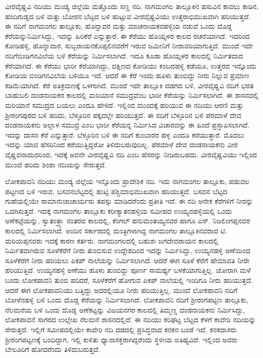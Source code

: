 ವೀರವೈಷ್ಣವಿ ನದಿಯು ಮಂಡ್ಯ ಜಿಲ್ಲೆಯ ಮತ್ತೊಂದು ಸಣ್ಣ ನದಿ. ನಾಗಮಂಗಲ ತಾಲ್ಲೂಕಿನ ಹಸುವಿನ ಕಾವಲು ಕಾಡಿನ, ಹಂದಿಗುಡ್ಡದ ಬಳಿ ಮತ್ತು ಬೋರನ ಬೆಟ್ಟದ ಬಳಿ ಹುಟ್ಟುವ ವೀರವೈಷ್ಣವಿಯು ಉತ್ತರಾಭಿಮುಖವಾಗಿ ಹರಿಯುತ್ತದೆ. ಈ ನದಿಗೆ ನಾಗಮಂಗಲ ತಾಲ್ಲೂಕು, ಹೊನ್ನಾವರ ಮತ್ತು ಮಾಚನಾಯಕನಹಳ್ಳಿಯ ನಡುವೆ ಒಂದು ದೊಡ್ಡ ಕೆರೆಯನ್ನು\break ನಿರ್ಮಿಸಿದ್ದು, ಇದನ್ನು ಹಿರಿಕೆರೆ ಎನ್ನುತ್ತಾರೆ. ಈ ಕೆರೆಯು ಹೊಯ್ಸಳರ ಕಾಲದ ರಚನೆಯಾಗಿದೆ. ಇದರಿಂದ ಕೋಡಿಹಳ್ಳಿ, ಹೊನ್ನಾವಾರ, ಸುಬ್ಬರಾಯನಕೊಪ್ಪಲಿನವರೆಗೆ ಇರುವ ಜಮೀನಿಗೆ ನೀರಾವರಿಯಾಗುತ್ತಿದೆ. ಮುಂದೆ ಇದೇ ನದಿಗೆ\break ಬಿಂಡಿಗನವಿಲೆಯ ಬಳಿ ಕೆರೆಯನ್ನು ನಿರ್ಮಿಸಲಾಗಿದೆ. ಇದೂ ಕೂಡಾ ಹೊಯ್ಸಳರ ಕಾಲದಲ್ಲಿ ನಿರ್ಮಿತವಾದ ಕೆರೆ\-ಯಾಗಿದೆ. ಈ ಕೆರೆಯು ಭಾರೀ ಕೆರೆಯಾಗಿದ್ದು, ದಕ್ಷಿಣದ ಕೋಡಿಯು ಕಂಬದಹಳ್ಳಿ ಕಡೆಯೂ, ಉತ್ತರದ ಇನ್ನೊಂದು ಕೋಡಿಯ ಬಿಂಡಿಗನವಿಲೆಯ ಬಳಿಯೂ ಇದೆ. ಆದರೆ ಈ ಕೆರೆ ಇಂದು ಹೂಳು ತುಂಬಿದ್ದು ನೀರು ನಿಲ್ಲುವ ಪ್ರಮಾಣ ಕಡಿಮೆಯಾಗಿದೆ. ಕೆರೆ ಅತಿಕ್ರಮಣಕ್ಕೆ ಒಳಗಾಗಿದೆ. ಮುಂದೆ ಇದೇ ತಾಲ್ಲೂಕಿ ದಡಗದ ಬಳಿ, ವೀರವೈಷ್ಣವಿ ನದಿಗೆ ಭರತ ಬಾಹುಬಲಿ ದಂಡನಾಯಕರ ಕಾಲದಲ್ಲಿ ಮರಿಯಾನೆ ಸಮುದ್ರವೆಂಬ ಭಾರೀ ಕೆರೆಯನ್ನು ನಿರ್ಮಿಸಲಾಗಿದೆ. ಈ ಶಾಸನದಲ್ಲಿ ಮರಿಯಾನೆ ಸಮುದ್ರದ ಬಯಲು ಎಂದೂ ಹೇಳಿದೆ. ಇಲ್ಲಿಂದ ಮುಂದಕ್ಕೆ ಹರಿಯುವ ಈ ನದಿಯು ಆರಣಿ ಮತ್ತು ಶ‍್ರೀರಂಗಪುರದ ಬಳಿ ಹರಿದು, ಬೆಳ್ಳೂರಿನ ಪಕ್ಕದಲ್ಲೇ ಹರಿಯುತ್ತದೆ. ಈ ನದಿಗೆ ಬೆಳ್ಳೂರಿನ ಬಳಿ ಪೆರಮಾಳೆ ದೇವ ದಂಡನಾಯಕನು ಅಲ್ಲಾಳ ಸಮುದ್ರ ಎಂಬ ಭಾರೀ ಕೆರೆಯನ್ನ ನಿರ್ಮಿಸಿದ ವಿಚಾರವನ್ನು ಈ ಹಿಂದೆ ಪ್ರಸ್ತಾಪಿಸಲಾಗಿದೆ. ಇದನ್ನು ದಾಸನ ಕೆರೆ ಎನ್ನುತ್ತಾರೆ. ಬೆಳ್ಳೂರಿನ ಬಳಿ ಈ ನದಿಗೆ ಕುಂಬಾರರ ಹಳ್ಳ ಎಂದೂ ಕರೆಯುತ್ತಾರೆ. ಮೊದಲು ಇದನ್ನು ಯಾವ ಹೆಸರಿನಿಂದ ಕರೆಯುತ್ತಿದ್ದರೋ ತಿಳಿದುಬರುವುದಿಲ್ಲ. ಪೆರಮಾಳೆ ದೇವ ದಂಡನಾಯಕನು ವೀರ ವೈಷ್ಣವನಾದುದರಿಂದ, ಇದಕ್ಕೆ ಅವನೇ ವೀರವೈಷ್ಣವಿ ನದಿ ಎಂಬ ಹೆಸರನ್ನು ನೀಡಿರುಬಹದು. ವೀರವೈಷ್ಣವಿಯು ಇಲ್ಲಿಂದ ಮುಂದೆ ಹರಿದು ಶಿಂಶಾ ನದಿಯನ್ನು ಸೇರುತ್ತದೆ.

ಲೋಕಪಾವನಿ ನದಿಯು ಮಂಡ್ಯ ಜಿಲ್ಲೆಯ ಇನ್ನೊಂದು ಪ್ರಾದೇಶಿಕ ನದಿ. ಇದು ನಾಗಮಂಗಲ ತಾಲ್ಲೂಕು, ಪಡುವಲ ಪಟ್ಟಣದ ಬಳಿ ಇರುವ, ಬಸವನಬೆಟ್ಟದಲ್ಲಿ ಹುಟ್ಟಿ ಪಶ್ಚಿಮಾಭಿಮುಖವಾಗಿ ಹರಿಯುತ್ತದೆ. ಬಸವನ ಬೆಟ್ಟದ ಗುಹೆಯಲ್ಲಿಯೇ ರಾಮಾನುಜಾಚಾರ್ಯರು ತಪಸ್ಸು ಮಾಡಿದರೆಂದು ಪ್ರತೀತಿ ಇದೆ. ಈ ನದಿ ಅನೇಕ ಕೆರೆಗಳಿಗೆ ನೀರನ್ನು ಒದಗಿಸುತ್ತದೆ. ಇದಕ್ಕೆ ನಾಗಮಂಗಲ ತಾಲ್ಲೂಕು ಕರೀಕ್ಯಾತನಹಳ್ಳಿಯ ಸಮೀಪದ ಉಯ್ಯನಹಳ್ಳಿಯಲ್ಲಿ ಒಂದು ಅಣೆಕಟ್ಟೆಯನ್ನು, ಸ್ವಾತಂತ್ರ್ಯಾ ನಂತರದ ಕಾಲದಲ್ಲಿ, ಕೆಂಗಲ್​ ಹನುಮಂತಯ್ಯನವರ ಹಾಗೂ ಎಸ್​. ನಿಜಲಿಂಗಪ್ಪನವರ ಕಾಲದಲ್ಲಿ ನಿರ್ಮಿಸಲಾಗಿದೆ. ಅಂದಿನ ಸರ್ಕಾರದಲ್ಲಿ ಮಂತ್ರಿಗಳಾಗಿದ್ದ ನಾಗಮಂಗಲ ತಾಲ್ಲೂಕಿನವರಾದ ಟಿ. ಮರಿಯಪ್ಪನವರು ಇದಕ್ಕೆ ಕಾರಣ ಕರ್ತರು. ನಾಗಮಂಗಲದಲ್ಲಿ ಬಹುಶಃ ಜಗದೇವರಾಯನ ಕಾಲದಲ್ಲಿ ನಿರ್ಮಿತವಾಗಿರುವ ಸೂಳೆಕೆರೆಗೆ ನೀರು ತುಂಬಿಸುವ ಉದ್ದೇಶದಿಂದ ಇದನ್ನು ನಿರ್ಮಿಸಿದ್ದು, ಉಯ್ಯನಹಳ್ಳಿ ಅಣೆಯಿಂದ ಸೂಳೆಕೆರೆಗೆ ನೀರು ಹರಿಯಲು ಪಿಕಪ್ ನಾಲೆಯನ್ನು ನಿರ್ಮಿಸಲಾಗಿದೆ. ಆದರೆ ಈಗ ಸೂಳೆ ಕೆರೆಗೆ ಹೇಮಾವತಿ ನೀರೇ ಹರಿಯುತ್ತಿದೆ. ಉಯ್ಯನಹಳ್ಳಿ ಅಣೆಯು ಹೂಳು ತುಂಬಿದ್ದು ಪೂರ್ಣ ಸಾಮರ್ಥ್ಯ ಬಳಕೆಯಾಗುತ್ತಿಲ್ಲ. ಜೋರಾಗಿ ಮಳೆ ಬಂದು ಲೋಕಪಾವನಿ ತುಂಬಿ ಹರಿದರೆ, ಸೂಳೆಕೆರೆಗೆ ಹೋಗುವ ಪಿಕಪ್​ ನಾಲೆಯಲ್ಲಿ ಇಂದಿಗೂ ನೀರು ಹರಿಯುತ್ತದೆ. ಆದರೆ ಈಗ ಲೋಕಪಾವನಿಯು ಬತ್ತಿದ್ದು ಅದರಲ್ಲಿಯೂ ನೀರು ಹರಿಯುತ್ತಿಲ್ಲ. ಮುಂದೆ ಲೋಕಪಾವನಿ ನದಿಗೆ ಬೋಳೆನಹಳ್ಳಿ ಬಳಿ ಒಂದು ದೊಡ್ಡ ಕೆರೆಯನ್ನು ನಿರ್ಮಿಸಲಾಗಿದೆ. ಲೋಕಪಾವನಿ ನದಿಗೆ ಶ‍್ರೀರಂಗಪಟ್ಟಣ ತಾಲ್ಲೂಕು, ನೆಲಮನೆಯ ಬಳಿ ಒಂದು ದೊಡ್ಡ ಅಣೆಕಟ್ಟನ್ನು ವಿಜಯನಗರ ಕಾಲದಲ್ಲಿ ತಿಮ್ಮಣ್ಣ ದಂಡನಾಯಕನು ನಿರ್ಮಿಸಿದ್ದು, ಲೋಕಪಾವನೆ ಸಾಗರದ ಉಲ್ಲೇಖ ನೆಲಮನೆ ಶಾಸನದಲ್ಲಿದೆ. ಈ ನದಿಯು ಕರಿಘಟ್ಟ ಬೆಟ್ಟದ ಕೆಳಗೆ ಕಾವೇರಿ ನದಿಯನ್ನು ಸೇರುತ್ತದೆ. ಇಲ್ಲಿಗೆ ಸಮೀಪದಲ್ಲಿಯೇ ಕಾವೇರಿ ನದಿ ದಡದಲ್ಲಿ ಪ್ರಸಿದ್ಧವಾದ ಕನಕನ ಬಂಡೆ ಇದೆ. ಕನಕದಾಸರು ಶ‍್ರೀರಂಗಪಟ್ಟಣಕ್ಕೆ ಬಂದಿದ್ದಾಗ, ಇಲ್ಲಿ ಕುಳಿತು ಧ್ಯಾನಾಸಕ್ತರಾಗಿದ್ದರೆಂದು ಸ್ಥಳೀಯ ಐತಿಹ್ಯವಿದೆ. ಇಲ್ಲಿಂದ ಅವರು ಬೇಲೂರಿಗೆ ಹೋದರೆಂದು ತಿಳಿದುಬರುತ್ತದೆ.

